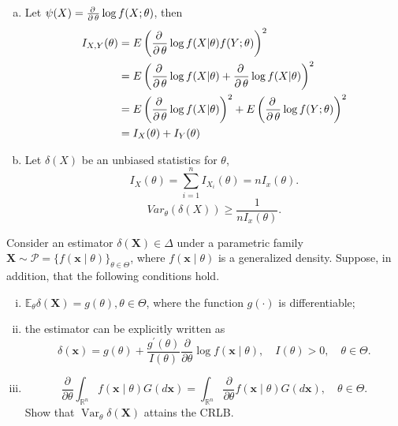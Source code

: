 \begin{solution}
    \begin{enumerate}[(a)]
        \item Let $\psi(X)=\frac{\partial\, }{\partial\, \theta}\log f(X; \theta)$, then 
        \[
            \begin{aligned}
                I_{X,Y}(\theta)&=E\left(\frac{\partial\,}{\partial\, \theta}\log f(X|\theta)f(Y;\theta)\right)^2\\
                &=E\left(\frac{\partial\,}{\partial\, \theta}\log f(X|\theta)+\frac{\partial\,}{\partial\, \theta}\log f(X|\theta)\right)^2\\
                &=E\left(\frac{\partial\,}{\partial\, \theta}\log f(X|\theta)\right)^2+E\left(\frac{\partial\,}{\partial\, \theta}\log f(Y;\theta)\right)^2\\
                &=I_X(\theta)+I_Y(\theta)
            \end{aligned}
        \]
        \item Let $\delta(X)$ be an unbiased statistics for $\theta$, 
        \[
            I_X(\theta)=\sum_{i=1}^nI_{X_i}(\theta)=nI_x(\theta). 
        \]
        \[
            Var_\theta(\delta(X))\geqslant\frac{1}{nI_x(\theta)}. 
        \]
    \end{enumerate}
\end{solution}


\begin{ex}
    Consider an estimator \(\delta(\mathbf{X}) \in \Delta\) under a parametric family \(\mathbf{X} \sim \mathcal{P}=\{f(\mathbf{x} \mid \theta)\}_{\theta \in \Theta}\), where \(f(\mathbf{x} \mid \theta)\) is a generalized density. Suppose, in addition, that the following conditions hold. 
    \begin{enumerate}[(i)]
        \item \(\mathbb{E}_{\theta} \delta(\mathbf{X})=g(\theta), \theta \in \Theta\), where the function \(g(\cdot)\) is differentiable; 
        \item the estimator can be explicitly written as
        \[
        \delta(\mathbf{x})=g(\theta)+\frac{g^{\prime}(\theta)}{I(\theta)} \frac{\partial}{\partial \theta} \log f(\mathbf{x} \mid \theta), \quad I(\theta)>0, \quad \theta \in \Theta. 
        \]
        \item \[
            \frac{\partial}{\partial \theta} \int_{\mathbb{R}^{n}} f(\mathbf{x} \mid \theta) G(d \mathbf{x})=\int_{\mathbb{R}^{n}} \frac{\partial}{\partial \theta} f(\mathbf{x} \mid \theta) G(d \mathbf{x}), \quad \theta \in \Theta .
        \]
        Show that \(\operatorname{Var}_{\theta} \delta(\mathbf{X})\) attains the CRLB. 
    \end{enumerate}
\end{ex}

